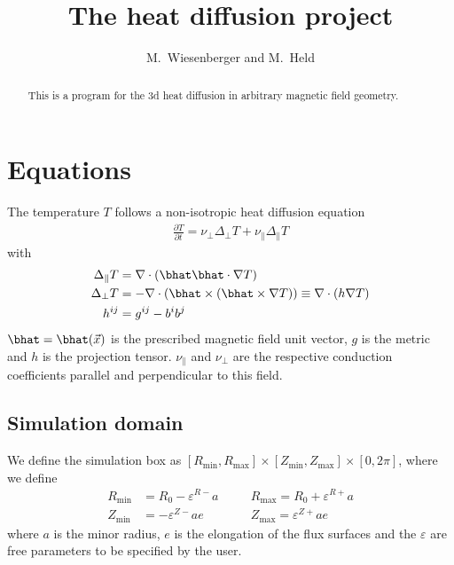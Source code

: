 





\title{The heat diffusion project}
\author{ M.~Wiesenberger and M.~Held}
\maketitle

\begin{abstract}
  This is a program for the 3d heat diffusion in arbitrary magnetic field
  geometry.
  \end{abstract}

\section{Equations}
The temperature $T$ follows a non-isotropic heat diffusion equation
\begin{align}
\frac{\partial T}{\partial t} = \nu_\perp \Delta_\perp T + \nu_\parallel\Delta_\parallel T
\label{eq:temperature}
\end{align}
with
\begin{align}
\Delta_\parallel T &= \nabla\cdot ( \bhat\bhat\cdot\nabla T) \\
\Delta_\perp T     &= -\nabla\cdot( \bhat\times(\bhat\times \nabla T)) \equiv \nabla\cdot (h \nabla T) \\
h^{ij} &= g^{ij} - b^ib^j
\end{align}
$\bhat = \bhat(\vec x)$ is the prescribed magnetic field unit vector, $g$ is the
metric and $h$ is the projection
tensor.
$\nu_\parallel$ and $\nu_\perp$ are the respective conduction
coefficients parallel and perpendicular to this field.

\subsection{Simulation domain}
We define the simulation box as
$[ R_{\min}, R_{\max}]\times [Z_{\min}, Z_{\max}] \times [0,2\pi]$,
where we define
\begin{align} \label{eq:box}
    R_{\min}&=R_0-\varepsilon^{R-}a\quad
    &&R_{\max}=R_0+\varepsilon^{R+}a\nonumber\\
    Z_{\min}&=-\varepsilon^{Z-}ae\quad
    &&Z_{\max}=\varepsilon^{Z+}ae
\end{align}
where $a$ is the minor radius, $e$ is the elongation of the flux surfaces and
the $\varepsilon$ are free parameters to be specified by the user.


